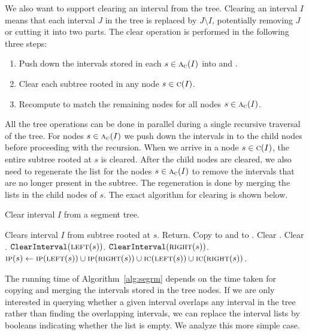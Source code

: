\documentclass[english,gradu]{tktltiki2018}
\begin{document}
We also want to support clearing an interval from the tree.
Clearing an interval $I$ means that each interval $J$ in the tree is replaced by $J\setminus I$, potentially removing $J$ or cutting it into two parts.
The clear operation is performed in the following three steps:
\begin{enumerate}
\item Push down the intervals stored in each $s\in\textsc{a}_{\textsc{c}}(I)$ into  and .
\item Clear each subtree rooted in any node $s\in\textsc{c}(I)$.
\item Recompute  to match the remaining nodes for all nodes $s\in\textsc{a}_{\textsc{c}}(I)$.
\end{enumerate}

All the tree operations can be done in parallel during a single recursive traversal of the tree.
For nodes $s\in\textsc{a}_{\textsc{c}}(I)$ we push down the intervals in  to the child nodes before proceeding with the recursion.
When we arrive in a node $s\in\textsc{c}(I)$, the entire subtree rooted at $s$ is cleared.
After the child nodes are cleared, we also need to regenerate the  list for the nodes $s\in\textsc{a}_{\textsc{c}}(I)$ to remove the intervals that are no longer present in the subtree.
The regeneration is done by merging the lists in the child nodes of $s$.
The exact algorithm for clearing is shown below.

\begin{alg}\label{alg:segrm}
Clear interval $I$ from a segment tree.
\begin{algorithmic}
	\Comment Clears interval $I$ from subtree rooted at $s$.
		\State Return.
	\EndIf
		\State Copy  to  and to .
	\EndIf
	\State Clear .
	\State Clear .
		\State $\texttt{ClearInterval}(\textsc{left}(s))$.
		\State $\texttt{ClearInterval}(\textsc{right}(s))$.
	\EndIf
		\State $\textsc{ip}(s)\gets \textsc{ip}(\textsc{left}(s)) \cup \textsc{ip}(\textsc{right}(s)) \cup \textsc{ic}(\textsc{left}(s)) \cup \textsc{ic}(\textsc{right}(s))$.
	\EndIf
\EndProcedure
\end{algorithmic}
\end{alg}

The running time of Algorithm~\ref{alg:segrm} depends on the time taken for copying and merging the intervals stored in the tree nodes.
If we are only interested in querying whether a given interval overlaps any interval in the tree rather than finding the overlapping intervals, we can replace the interval lists by booleans indicating whether the list is empty.
We analyze this more simple case.
\end{document}
